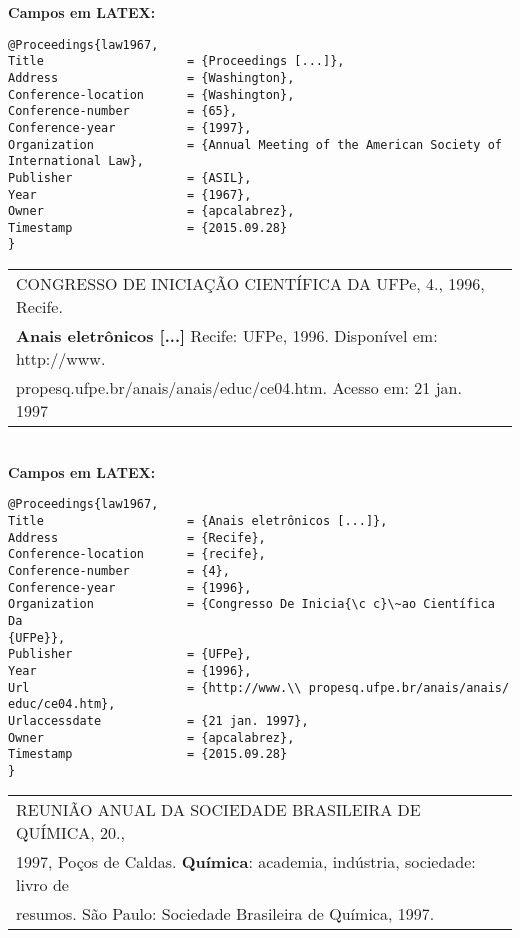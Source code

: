 \textbf{Campos em LATEX:} 

\begin{verbatim}
@Proceedings{law1967,
Title                    = {Proceedings [...]},
Address                  = {Washington},
Conference-location      = {Washington},
Conference-number        = {65},
Conference-year          = {1997},
Organization             = {Annual Meeting of the American Society of 
International Law},
Publisher                = {ASIL},
Year                     = {1967},
Owner                    = {apcalabrez},
Timestamp                = {2015.09.28}
}
\end{verbatim}

\begin{tabular}{|l|c|} \hline
	CONGRESSO DE INICIAÇÃO CIENTÍFICA DA UFPe, 4., 1996, Recife. \\ \textbf{Anais eletrônicos [...]} Recife: UFPe, 1996. Disponível em: http://www.\\ propesq.ufpe.br/anais/anais/educ/ce04.htm. Acesso em: 21 jan. 1997 \\\hline
\end{tabular} \\

\textbf{Campos em LATEX:} 

\begin{verbatim}
@Proceedings{law1967,
Title                    = {Anais eletrônicos [...]},
Address                  = {Recife},
Conference-location      = {recife},
Conference-number        = {4},
Conference-year          = {1996},
Organization             = {Congresso De Inicia{\c c}\~ao Científica Da 
{UFPe}},
Publisher                = {UFPe},
Year                     = {1996},
Url                      = {http://www.\\ propesq.ufpe.br/anais/anais/
educ/ce04.htm},
Urlaccessdate            = {21 jan. 1997},
Owner                    = {apcalabrez},
Timestamp                = {2015.09.28}
}
\end{verbatim}

\begin{tabular}{|l|c|} \hline
	REUNIÃO ANUAL DA SOCIEDADE BRASILEIRA DE QUÍMICA, 20., \\1997, Poços de Caldas. \textbf{Química}: academia, indústria, sociedade: livro de \\resumos. São Paulo: Sociedade Brasileira de Química, 1997.  \\\hline
\end{tabular} \\

